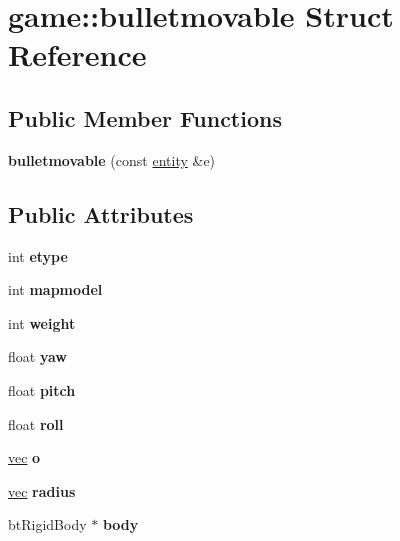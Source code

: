 \hypertarget{structgame_1_1bulletmovable}{}\section{game\+:\+:bulletmovable Struct Reference}
\label{structgame_1_1bulletmovable}
\subsection*{Public Member Functions}
\begin{DoxyCompactItemize}
\item 
\mbox{\label{structgame_1_1bulletmovable_a9cb266b6e5ade1870638c54a21da1c70}} 
{\bfseries bulletmovable} (const \hyperlink{structentity}{entity} \&e)
\end{DoxyCompactItemize}
\subsection*{Public Attributes}
\begin{DoxyCompactItemize}
\item 
\mbox{\label{structgame_1_1bulletmovable_ad248b5cebbcc72da902ace252d1569d3}} 
int {\bfseries etype}
\item 
\mbox{\label{structgame_1_1bulletmovable_a3ce7b403eb503a74a5715a68c587b98a}} 
int {\bfseries mapmodel}
\item 
\mbox{\label{structgame_1_1bulletmovable_a9f30fa9649c5b1b060f7df5df71d3335}} 
int {\bfseries weight}
\item 
\mbox{\label{structgame_1_1bulletmovable_adaa62f77b522d18346f4fa1f4b8df44c}} 
float {\bfseries yaw}
\item 
\mbox{\label{structgame_1_1bulletmovable_a779b9138c82b225d79cb6a902bf2056f}} 
float {\bfseries pitch}
\item 
\mbox{\label{structgame_1_1bulletmovable_a8388285c4c000e711cf40df9e3d32e50}} 
float {\bfseries roll}
\item 
\mbox{\label{structgame_1_1bulletmovable_a0ddec26746c32b51aebad568f5c976df}} 
\hyperlink{structvec}{vec} {\bfseries o}
\item 
\mbox{\label{structgame_1_1bulletmovable_a86329554af2d1db43c87af441d9eded1}} 
\hyperlink{structvec}{vec} {\bfseries radius}
\item 
\mbox{\label{structgame_1_1bulletmovable_ac4cee1b1aa4a467bbfd5011ccd62de1d}} 
bt\+Rigid\+Body $\ast$ {\bfseries body}
\end{DoxyCompactItemize}


